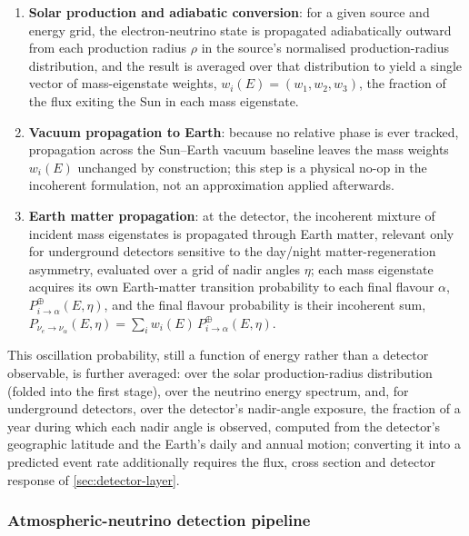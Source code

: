 \begin{enumerate}
  \item \textbf{Solar production and adiabatic conversion}: for a given source and energy grid, the electron-neutrino state is propagated adiabatically outward from each production radius \(\rho\) in the source's normalised production-radius distribution, and the result is averaged over that distribution to yield a single vector of mass-eigenstate weights, \(w_i(E)=(w_1,w_2,w_3)\), the fraction of the flux exiting the Sun in each mass eigenstate.
  \item \textbf{Vacuum propagation to Earth}: because no relative phase is ever tracked, propagation across the Sun--Earth vacuum baseline leaves the mass weights \(w_i(E)\) unchanged by construction; this step is a physical no-op in the incoherent formulation, not an approximation applied afterwards.
  \item \textbf{Earth matter propagation}: at the detector, the incoherent mixture of incident mass eigenstates is propagated through Earth matter, relevant only for underground detectors sensitive to the day/night matter-regeneration asymmetry, evaluated over a grid of nadir angles \(\eta\); each mass eigenstate acquires its own Earth-matter transition probability to each final flavour \(\alpha\), \(P^\oplus_{i\to\alpha}(E,\eta)\), and the final flavour probability is their incoherent sum, \(P_{\nu_e\to\nu_\alpha}(E,\eta)=\sum_i w_i(E)\,P^\oplus_{i\to\alpha}(E,\eta)\).
\end{enumerate}

This oscillation probability, still a function of energy rather than a detector observable, is further averaged: over the solar production-radius distribution (folded into the first stage), over the neutrino energy spectrum, and, for underground detectors, over the detector's nadir-angle exposure, the fraction of a year during which each nadir angle is observed, computed from the detector's geographic latitude and the Earth's daily and annual motion; converting it into a predicted event rate additionally requires the flux, cross section and detector response of \cref{sec:detector-layer}.

\subsubsection{Atmospheric-neutrino detection pipeline}

